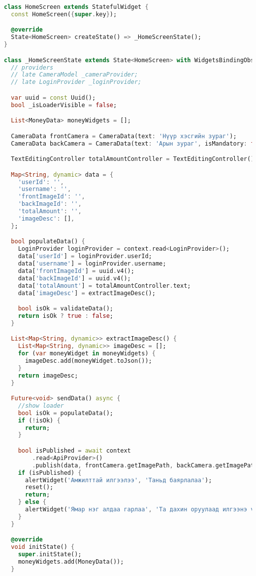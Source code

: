 \begin{lstlisting}[language=Dart, caption=Дата цуглуулалтын логик хэрэгжүүлэлт, frame=single]
class HomeScreen extends StatefulWidget {
  const HomeScreen({super.key});

  @override
  State<HomeScreen> createState() => _HomeScreenState();
}

class _HomeScreenState extends State<HomeScreen> with WidgetsBindingObserver {
  // providers
  // late CameraModel _cameraProvider;
  // late LoginProvider _loginProvider;

  var uuid = const Uuid();
  bool _isLoaderVisible = false;

  List<MoneyData> moneyWidgets = [];

  CameraData frontCamera = CameraData(text: 'Нүүр хэсгийн зураг');
  CameraData backCamera = CameraData(text: 'Арын зураг', isMandatory: false);

  TextEditingController totalAmountController = TextEditingController();

  Map<String, dynamic> data = {
    'userId': '',
    'username': '',
    'frontImageId': '',
    'backImageId': '',
    'totalAmount': '',
    'imageDesc': [],
  };

  bool populateData() {
    LoginProvider loginProvider = context.read<LoginProvider>();
    data['userId'] = loginProvider.userId;
    data['username'] = loginProvider.username;
    data['frontImageId'] = uuid.v4();
    data['backImageId'] = uuid.v4();
    data['totalAmount'] = totalAmountController.text;
    data['imageDesc'] = extractImageDesc();

    bool isOk = validateData();
    return isOk ? true : false;
  }

  List<Map<String, dynamic>> extractImageDesc() {
    List<Map<String, dynamic>> imageDesc = [];
    for (var moneyWidget in moneyWidgets) {
      imageDesc.add(moneyWidget.toJson());
    }
    return imageDesc;
  }

  Future<void> sendData() async {
    //show loader
    bool isOk = populateData();
    if (!isOk) {
      return;
    }

    bool isPublished = await context
        .read<ApiProvider>()
        .publish(data, frontCamera.getImagePath, backCamera.getImagePath);
    if (isPublished) {
      alertWidget('Амжилттай илгээлээ', 'Таньд баярлалаа');
      reset();
      return;
    } else {
      alertWidget('Ямар нэг алдаа гарлаа', 'Та дахин оруулаад илгээнэ үү');
    }
  }

  @override
  void initState() {
    super.initState();
    moneyWidgets.add(MoneyData());
  }


\end{lstlisting}
